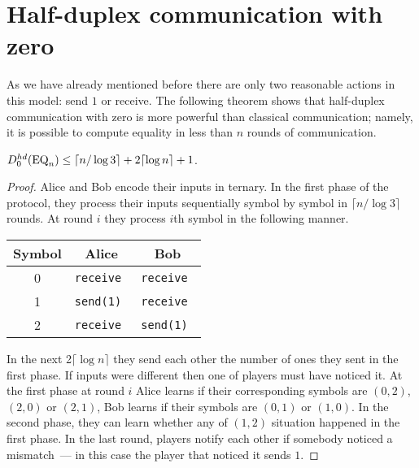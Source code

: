 \section{Half-duplex communication with zero}\label{sec:hdz}
As we have already mentioned before there are only two reasonable actions in this model: send
$1$ or receive. The following theorem shows that half-duplex communication with zero is more powerful than classical communication; namely, it is possible to compute equality
in less than $n$ rounds of communication. 
\begin{theorem}
$D^{hd}_0(\mathrm{EQ}_n) \le \lceil n/\log 3\rceil + 2\lceil \log n\rceil + 1$.
\end{theorem}
\begin{proof}
Alice and Bob encode their inputs in ternary. 
In the first phase of the protocol, they process their inputs sequentially symbol by symbol in $\lceil n/\log 3\rceil$ rounds. 
At round $i$ they process $i$th symbol in the following manner.
\begin{center}
\begin{tabular}{c|c|c}
\bf Symbol & \bf Alice & \bf Bob \\\hline 
0 & \tt receive  & \tt receive  \\\hline
1 & \tt send(1)  & \tt receive  \\\hline
2 & \tt receive  & \tt send(1) 
\end{tabular}
\end{center}
In the next 2$\lceil \log n\rceil$ they send each other the number of ones 
they sent in the first phase. If inputs were different then one of players must have noticed it.
At the first phase at round $i$ Alice learns if their corresponding symbols 
are $(0, 2)$, $(2,0)$ or $(2,1)$, Bob learns if their symbols are $(0, 1)$ or $(1,0)$.
In the second phase, they can learn whether any of $(1,2)$ situation happened in
the first phase. In the last round, players notify each other if somebody
noticed a mismatch~— in this case the player that noticed it sends $1$.
\end{proof}

